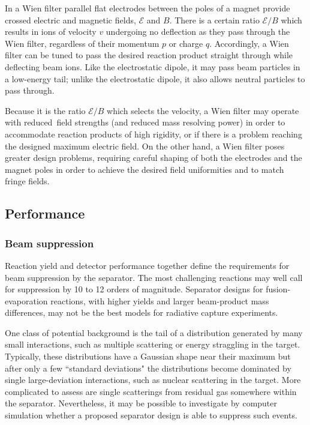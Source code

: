 In a Wien filter parallel flat electrodes between the poles of a magnet provide crossed electric and magnetic fields, $\mathcal{E}$ and $B$.      There is a certain ratio $\mathcal{E}/B$ which results in ions of velocity $v$  undergoing no deflection as they pass through the Wien filter, regardless of their momentum $p$ or charge $q$.    Accordingly, a Wien filter can be tuned to pass the desired reaction product straight through while deflecting beam ions.  Like the electrostatic dipole, it may pass beam particles in  a low-energy tail; unlike the electrostatic dipole, it  also allows   neutral particles to pass through.

Because it is  the ratio $\mathcal{E}/B$ which selects the velocity, a Wien filter may operate with reduced\ field strengths (and reduced mass resolving power)  in order to accommodate reaction products of high rigidity, or if there is a problem reaching the designed maximum electric field.    On the other hand, a Wien filter poses greater design problems, requiring careful shaping of both the electrodes and the magnet poles in order to achieve the desired field uniformities and to match fringe fields.

\subsection{Performance}

\subsubsection{Beam suppression}
Reaction yield and detector performance together define the requirements for beam suppression by the separator.    The most challenging reactions  may well call for suppression by 10 to 12 orders of magnitude.    Separator designs for fusion-evaporation reactions, with higher yields and larger beam-product mass differences, may not be the best models  for radiative capture experiments.   
    
 One class of potential background is the tail of a  distribution generated by many small interactions, such as multiple scattering or energy straggling in the target.    Typically, these distributions have a Gaussian shape near their maximum but after only a few  ``standard deviations" the distributions become dominated by single large-deviation interactions, such as nuclear scattering in the target.    More complicated to assess are single scatterings from residual gas somewhere within the separator.   Nevertheless, it may be possible to investigate by computer simulation whether  a proposed separator design is able to suppress such events.
 
